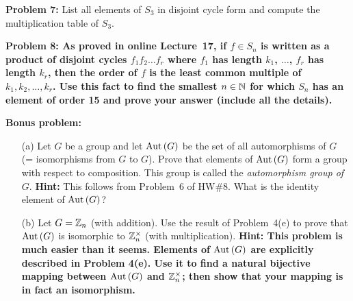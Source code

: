 \documentclass[11pt]{amsart}
\begin{document}
{\bf Problem 7:} List all elements of $S_3$ in disjoint cycle form and compute the multiplication table of $S_3$.
\skv

\skv
\bf{Problem 8: }\rm As proved in online Lecture~17, if $f\in S_n$ is written as a product of
disjoint cycles $f_1 f_2\ldots f_r$ where
$f_1$ has length $k_1$, $\ldots$, $f_r$ has length $k_r$,
then the order of $f$ is the least common multiple
of $k_1, k_2,\ldots, k_r$. Use this fact to find the smallest $n\in{\mathbb N}$ for which $S_n$
has an element of order 15 and prove your answer (include all the details).
\skv

\bf{Bonus problem: }\rm 
\begin{itemize}
\item[(a)] Let $G$ be a group and let ${\rm Aut\,}(G)$ be the set of
all automorphisms of $G$ (= isomorphisms from $G$ to $G$). Prove
that elements of ${\rm Aut\,}(G)$ form a group with respect to composition.
This group is called the {\it automorphism group of $G$}.
{\bf Hint:}  This follows from Problem~6 of HW\#8.
What is the identity element of ${\rm Aut\,}(G)$?

\item[(b)] Let $G={\mathbb Z}_n$ (with addition). Use the result of Problem~4(e)
to prove that ${\rm Aut\,}(G)$ is isomorphic to ${\mathbb Z}_n^{\times}$ (with multiplication).
\bf{Hint: }\rm This problem is much easier than it seems.
Elements of ${\rm Aut\,}(G)$ are explicitly described in Problem 4(e).
Use it to find a natural bijective mapping between ${\rm Aut\,}(G)$
and ${\mathbb Z}_n^{\times}$; then show that your mapping is in fact 
an isomorphism.
\end{itemize}
\end{document}
